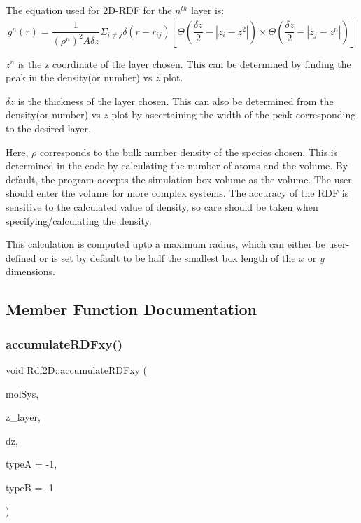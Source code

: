 The equation used for 2\+D-\/\+R\+DF for the $n^{th}$ layer is\+: \[ g^n(r) = \frac{1}{(\rho^n)^2 A \delta z} \Sigma_{i \neq j} \delta(r - r_{ij}) \left[ \Theta\left( \frac{\delta z}{2}-|z_i-z^2| \right) \times \Theta\left( \frac{\delta z}{2}-|z_j-z^n| \right) \right] \]
\begin{DoxyItemize}
\item $z^n$ is the z coordinate of the layer chosen. This can be determined by finding the peak in the density(or number) vs $z$ plot.
\item $\delta z$ is the thickness of the layer chosen. This can also be determined from the density(or number) vs $z$ plot by ascertaining the width of the peak corresponding to the desired layer.
\item Here, $\rho$ corresponds to the bulk number density of the species chosen. This is determined in the code by calculating the number of atoms and the volume. By default, the program accepts the simulation box volume as the volume. The user should enter the volume for more complex systems. The accuracy of the R\+DF is sensitive to the calculated value of density, so care should be taken when specifying/calculating the density.
\item This calculation is computed upto a maximum radius, which can either be user-\/defined or is set by default to be half the smallest box length of the $x$ or $y$ dimensions. 
\end{DoxyItemize}

\subsection{Member Function Documentation}
\mbox{\label{classRdf2D_a6c716851d80fd2a7dcfefd219892d87b}} 
\subsubsection{\texorpdfstring{accumulate\+R\+D\+Fxy()}{accumulateRDFxy()}}
{\footnotesize\ttfamily void Rdf2\+D\+::accumulate\+R\+D\+Fxy (\begin{DoxyParamCaption}\item[{class \mbox{\hyperlink{classCMolecularSystem}{C\+Molecular\+System}} \&}]{mol\+Sys,  }\item[{double}]{z\+\_\+layer,  }\item[{double}]{dz,  }\item[{int}]{typeA = {\ttfamily -\/1},  }\item[{int}]{typeB = {\ttfamily -\/1} }\end{DoxyParamCaption})}

